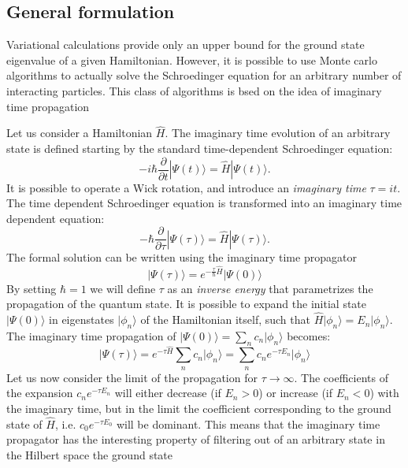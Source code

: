 \subsection{General formulation}
Variational calculations provide only an upper bound for the ground state eigenvalue of a 
given Hamiltonian. However, it is possible to use Monte carlo algorithms to actually solve
the Schroedinger equation for an arbitrary number of interacting particles. This class of algorithms is bsed on the idea of imaginary time propagation

Let us consider a Hamiltonian $\hat{H}$. The imaginary time evolution of an arbitrary state is defined starting by the standard time-dependent Schroedinger equation:
\begin{equation}
-i\hbar\frac{\partial}{\partial t}|\Psi(t)\rangle = \hat{H}|\Psi(t)\rangle.
\end{equation}
It is possible to operate a Wick rotation, and introduce an {\it imaginary time} $\tau=it$. The 
time dependent Schroedinger equation is transformed into an imaginary time dependent equation:
\begin{equation}
-\hbar\frac{\partial}{\partial \tau}|\Psi(\tau)\rangle = \hat{H}|\Psi(\tau)\rangle.
\end{equation}
The formal solution can be written using the imaginary time propagator
\begin{equation}
\vert\Psi(\tau)\rangle=e^{-\frac{\tau}{\hbar}\hat{H}}\vert\Psi(0)\rangle
\end{equation}
By setting $\hbar=1$ we will define $\tau$ as an {\it inverse energy} that parametrizes the propagation of the quantum state. It is possible to expand the initial state $\vert \Psi(0)\rangle$ in eigenstates $\vert\phi_n\rangle$ of the Hamiltonian itself, such that $\hat{H}\vert\phi_n\rangle=E_n\vert\phi_n\rangle$. The imaginary time propagation of $\vert\Psi(0)\rangle=\sum_nc_n \vert\phi_n\rangle$ becomes:
\begin{equation}
\vert\Psi(\tau)\rangle=e^{-\tau\hat{H}}\sum_n c_n\vert\phi_n\rangle=
\sum_n c_n e^{-\tau E_n}\vert\phi_n\rangle
\end{equation}   
Let us now consider the limit of the propagation for $\tau\rightarrow\infty$. The coefficients of the expansion $c_n e^{-\tau E_n}$ will either decrease (if $E_n>0$) or increase (if $E_n<0$) with the
imaginary time, but in the limit the coefficient corresponding to the ground state of $\hat{H}$, i.e.
$c_0 e^{-\tau E_0}$ will be dominant. This means that the imaginary time propagator has the interesting property of filtering out of an arbitrary state in the Hilbert space the ground state
